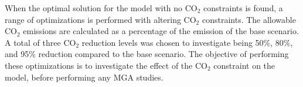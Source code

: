 When the optimal solution for the model with no $\text{CO}_2$ constraints is found, a range of optimizations is performed with altering $\text{CO}_2$ constraints. The allowable $\text{CO}_2$ emissions are calculated as a percentage of the emission of the base scenario. A total of three $\text{CO}_2$ reduction levels was chosen to investigate being 50\%, 80\%, and 95\% reduction compared to the base scenario. The objective of performing these optimizations is to investigate the effect of the $\text{CO}_2$ constraint on the model, before performing any MGA studies. 


